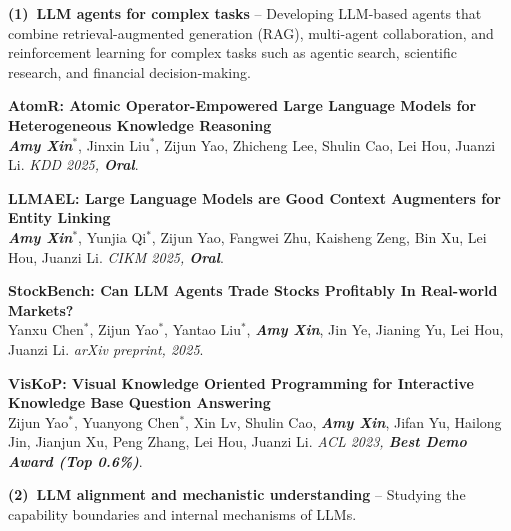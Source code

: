 \documentclass[letterpaper,11pt,UTF8]{article}
\newcommand{\highlight}[1]{\textcolor[RGB]{150,0,0}{\textbf{\textit{#1}}}}
\newcommand{\myauthor}[1]{\textcolor[RGB]{100,0,0}{\textbf{\textit{#1}}}}
\begin{document}
\vspace{0.1in}
\textbf{(1)~LLM agents for complex tasks} -- Developing LLM-based agents that combine retrieval-augmented generation (RAG), multi-agent collaboration, and reinforcement learning for complex tasks such as agentic search, scientific research, and financial decision-making.

\begin{enumerate}[topsep=0pt,leftmargin=18pt,label={[\arabic*]}]
    \item \textbf{AtomR: Atomic Operator-Empowered Large Language Models for Heterogeneous Knowledge Reasoning} \\ \myauthor{Amy Xin$^*$}, Jinxin Liu$^*$, Zijun Yao, Zhicheng Lee, Shulin Cao, Lei Hou, Juanzi Li. \textit{KDD 2025, \highlight{Oral}}.
    \item \textbf{LLMAEL: Large Language Models are Good Context Augmenters for Entity Linking} \\ \myauthor{Amy Xin$^*$}, Yunjia Qi$^*$, Zijun Yao, Fangwei Zhu, Kaisheng Zeng, Bin Xu, Lei Hou, Juanzi Li. \textit{CIKM 2025, \highlight{Oral}}.
    \item \textbf{StockBench: Can LLM Agents Trade Stocks Profitably In Real-world Markets?} \\ Yanxu Chen$^*$, Zijun Yao$^*$, Yantao Liu$^*$, \myauthor{Amy Xin}, Jin Ye, Jianing Yu, Lei Hou, Juanzi Li. \textit{arXiv preprint, 2025}.
    \item \textbf{VisKoP: Visual Knowledge Oriented Programming for Interactive Knowledge Base Question Answering} \\ Zijun Yao$^*$, Yuanyong Chen$^*$, Xin Lv, Shulin Cao, \myauthor{Amy Xin}, Jifan Yu, Hailong Jin, Jianjun Xu, Peng Zhang, Lei Hou, Juanzi Li. \textit{ACL 2023, \highlight{Best Demo Award (Top 0.6\%)}}.
\end{enumerate}

\vspace{0.1in}
\textbf{(2)~LLM alignment and mechanistic understanding} -- Studying the capability boundaries and internal mechanisms of LLMs.
\end{document}
